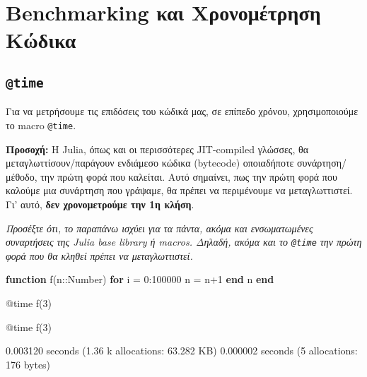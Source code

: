 \documentclass[]{article}
\date{}
\newenvironment{Shaded}{}{}
\newcommand{\KeywordTok}[1]{\textcolor[rgb]{0.00,0.44,0.13}{\textbf{#1}}}
\newcommand{\DataTypeTok}[1]{\textcolor[rgb]{0.56,0.13,0.00}{#1}}
\newcommand{\FloatTok}[1]{\textcolor[rgb]{0.25,0.63,0.44}{#1}}
\newcommand{\NormalTok}[1]{#1}
\begin{document}
\section{Benchmarking και Χρονομέτρηση
Κώδικα}\label{benchmarking-ux3baux3b1ux3b9-ux3c7ux3c1ux3bfux3bdux3bfux3bcux3adux3c4ux3c1ux3b7ux3c3ux3b7-ux3baux3ceux3b4ux3b9ux3baux3b1}

\subsection{\texorpdfstring{\texttt{@time}}{@time}}\label{time}

Για να μετρήσουμε τις επιδόσεις του κώδικά μας, σε επίπεδο χρόνου,
χρησιμοποιούμε το macro \texttt{@time}.

\textbf{Προσοχή:} Η Julia, όπως και οι περισσότερες JIT-compiled
γλώσσες, θα μεταγλωττίσουν/παράγουν ενδιάμεσο κώδικα (bytecode)
οποιαδήποτε συνάρτηση/μέθοδο, την πρώτη φορά που καλείται. Αυτό
σημαίνει, πως την πρώτη φορά που καλούμε μια συνάρτηση που γράψαμε, θα
πρέπει να περιμένουμε να μεταγλωττιστεί. Γι' αυτό, \textbf{δεν
χρονομετρούμε την 1η κλήση}.

\emph{Προσέξτε ότι, το παραπάνω ισχύει για τα πάντα, ακόμα και
ενσωματωμένες συναρτήσεις της Julia base library ή macros. Δηλαδή, ακόμα
και το \texttt{@time} την πρώτη φορά που θα κληθεί πρέπει να
μεταγλωττιστεί.}

\begin{Shaded}
\begin{Highlighting}[]
\KeywordTok{function}\NormalTok{ f(n::}\DataTypeTok{Number}\NormalTok{)}
  \KeywordTok{for}\NormalTok{ i = }\FloatTok{0}\NormalTok{:}\FloatTok{100000}
\NormalTok{    n = n+}\FloatTok{1}
  \KeywordTok{end}
\NormalTok{  n}
\KeywordTok{end}

\NormalTok{@time f(}\FloatTok{3}\NormalTok{)}

\NormalTok{@time f(}\FloatTok{3}\NormalTok{)}
\end{Highlighting}
\end{Shaded}

\begin{Shaded}
\begin{Highlighting}[]
\FloatTok{0.003120}\NormalTok{ seconds (}\FloatTok{1.36}\NormalTok{ k allocations: }\FloatTok{63.282}\NormalTok{ KB)}
\FloatTok{0.000002}\NormalTok{ seconds (}\FloatTok{5}\NormalTok{ allocations: }\FloatTok{176}\NormalTok{ bytes)}
\end{Highlighting}
\end{Shaded}
\end{document}
